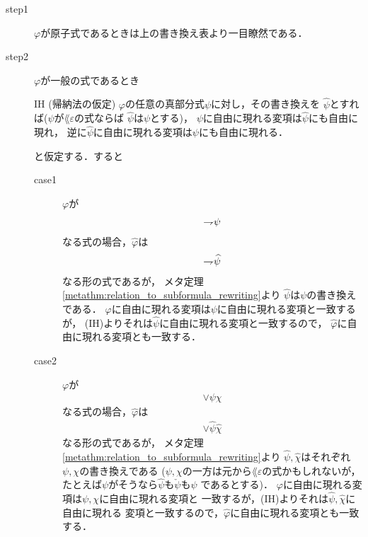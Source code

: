 	\begin{metaprf}\mbox{}
		\begin{description}
			\item[step1] $\varphi$が原子式であるときは上の書き換え表より一目瞭然である．
			
			\item[step2]
				$\varphi$が一般の式であるとき
				\begin{itembox}[l]{IH (帰納法の仮定)}
					$\varphi$の任意の真部分式$\psi$に対し，その書き換えを
					$\widehat{\psi}$とすれば($\psi$が$\lang{\varepsilon}$の式ならば
					$\widehat{\psi}$は$\psi$とする)，
					$\psi$に自由に現れる変項は$\widehat{\psi}$にも自由に現れ，
					逆に$\widehat{\psi}$に自由に現れる変項は$\psi$にも自由に現れる．
				\end{itembox}
				と仮定する．すると
				\begin{description}
					\item[case1] $\varphi$が
						\begin{align}
							\rightharpoondown\hspace{-0.25em} \psi
						\end{align}
						なる式の場合，$\widehat{\varphi}$は
						\begin{align}
							\rightharpoondown\hspace{-0.25em} \widehat{\psi}
						\end{align}
						なる形の式であるが，
						メタ定理\ref{metathm:relation_to_subformula_rewriting}より
						$\widehat{\psi}$は$\psi$の書き換えである．
						$\varphi$に自由に現れる変項は$\psi$に自由に現れる変項と一致するが，
						(IH)よりそれは$\widehat{\psi}$に自由に現れる変項と一致するので，
						$\widehat{\varphi}$に自由に現れる変項とも一致する．
						
					\item[case2] $\varphi$が
						\begin{align}
							\vee \psi \chi
						\end{align}
						なる式の場合，$\widehat{\varphi}$は
						\begin{align}
							\vee \widehat{\psi} \widehat{\chi}
						\end{align}
						なる形の式であるが，
						メタ定理\ref{metathm:relation_to_subformula_rewriting}より
						$\widehat{\psi},\widehat{\chi}$はそれぞれ$\psi,\chi$の書き換えである
						($\psi,\chi$の一方は元から$\lang{\varepsilon}$の式かもしれないが，
						たとえば$\psi$がそうなら$\widehat{\psi}$も$\check{\psi}$も$\psi$
						であるとする)．
						$\varphi$に自由に現れる変項は$\psi,\chi$に自由に現れる変項と
						一致するが，(IH)よりそれは$\widehat{\psi},\widehat{\chi}$に自由に現れる
						変項と一致するので，$\widehat{\varphi}$に自由に現れる変項とも一致する．
					

\end{description}
\end{description}
\end{metaprf}
